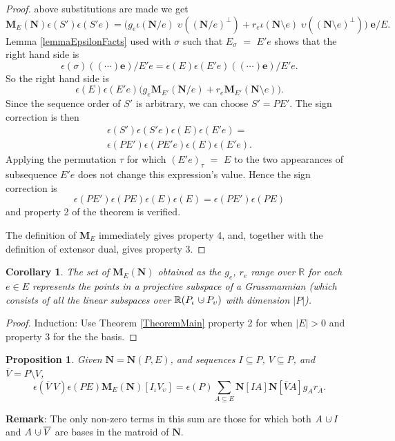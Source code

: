 \documentclass[12pt]{article}
\newtheorem{proposition}[theorem]{Proposition}
\newtheorem{corollary}[theorem]{Corollary}
\theoremstyle{definition}
\newcommand{\Remark}{\textbf{Remark}}
\newcommand{\dunion}
{\mbox{\hbox{\hskip6pt$\cdot$\hskip-5.50pt$\cup$\hskip2pt}}}
\newcommand{\scomp}[1]{\ensuremath{\overline{#1}}}
\newcommand{\scma}{\ensuremath{\ }}
\newcommand{\Is}{\ensuremath{\iota}}
\newcommand{\Vs}{\ensuremath{\upsilon}}
\newcommand{\Reals}{\ensuremath{\mathbb{R}}}
\newcommand{\Card}[1]{\ensuremath{{\left|#1\right|}}}
\newcommand{\ext}[1]{\ensuremath{\mathbf{#1}}}
\begin{document}
\begin{proof}
above substitutions are made we get
\[
\ext{M}_E(\ext{N})\epsilon(S')\epsilon(S'e) =
\big(g_e \Is(\ext{N}/e)\;\Vs((\ext{N}/e)^\perp)+
r_e\Is(\ext{N}\setminus e)\;\Vs((\ext{N}\setminus e)^\perp)\big)\;\ext{e}/E.
\]
Lemma \ref{lemmaEpsilonFacts} used with $\sigma$ such that
$E_\sigma$ $=$ $E'e$ shows that the right hand side is
\[
\epsilon(\sigma)((\cdots)\ext{e})/E'e = 
\epsilon(E)\epsilon(E'e)((\cdots)\ext{e})/E'e.
\]
So the right hand side is
\[
\epsilon(E)\epsilon(E'e)\big(g_e\ext{M}_{E'}(\ext{N}/e)+r_e\ext{M}_{E'}(\ext{N}\setminus e)\big).
\]
Since the sequence order of $S'$ is arbitrary, we can choose $S'=PE'$.  The sign correction is then
\begin{equation*}
\begin{split}
\epsilon(S')\epsilon(S'e)\epsilon(E)\epsilon(E'e)=\\
\epsilon(PE')\epsilon(PE'e)\epsilon(E)\epsilon(E'e).
\end{split}
\end{equation*}
Applying the permutation $\tau$ for which $(E'e)_\tau$ $=$ $E$ to the two
appearances of subsequence $E'e$ does not change this expression's value. 
Hence the sign correction is
\[
\epsilon(PE')\epsilon(PE)\epsilon(E)\epsilon(E)=\epsilon(PE')\epsilon(PE)
\]
and property 2 of the theorem is verified.

The definition of $\ext{M}_E$ immediately gives property 4, and, together
with the definition of extensor dual, gives property 3.
\end{proof}


\begin{corollary}
The set of $\ext{M}_E(\ext{N})$ 
obtained as the $g_e$, $r_e$ range over $\Reals$ for
each $e\in E$ represents the points in a 
projective subspace of a Grassmannian 
(which consists of all the
linear subspaces over $\Reals (P_{\Is}\dunion P_{\Vs})$ 
with 
dimension $\Card{P}$).
\end{corollary}


\begin{proof}
Induction: Use Theorem \ref{TheoremMain} property 2 for when $|E|>0$ and 
property 3
for the the basis.
\end{proof}

\begin{proposition}Given $\ext{N}=\ext{N}(P,E)$,
and sequences $I\subseteq P$, $V\subseteq P$, and $\scomp{V}=P\setminus V$,
\label{PropositionMain}
\[
\epsilon(\scomp{V}\scma V)\epsilon(PE)\ext{M}_E(\ext{N})[I_{\Is}V_{\Vs}] = 
\epsilon(P)\sum_{A\subseteq E}\ext{N}[IA]\ext{N}
[\scomp{V}A]g_Ar_{\scomp{A}}.
\]
\end{proposition}
\Remark: The only non-zero terms in this sum are those for which both $A\dunion I$
and $A\dunion \scomp{V}$ are bases in the matroid of $\ext{N}$.
\end{document}
